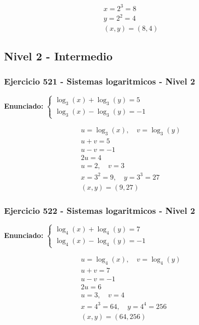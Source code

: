 \documentclass[12pt,a4paper]{article}
\begin{document}
\[
\begin{aligned}
x=2^{3}=8\\
y=2^{2}=4\\
\boxed{(x,y)=(8,4)}
\end{aligned}
\]


\newpage

\subsection*{Nivel 2 - Intermedio}

\subsubsection*{Ejercicio 521 - Sistemas logaritmicos - Nivel 2}
\textbf{Enunciado:} \(\begin{cases} \log_{3}\left(x\right)+\log_{3}\left(y\right)=5\\ \log_{3}\left(x\right)-\log_{3}\left(y\right)=-1\end{cases}\)

\[
\begin{aligned}
u=\log_{3}\left(x\right),\quad v=\log_{3}\left(y\right)\\
u+v=5\\
u-v=-1\\
2u=4\\
u=2,\quad v=3\\
x=3^{2}=9,\quad y=3^{3}=27\\
\boxed{(x,y)=(9,27)}
\end{aligned}
\]


\subsubsection*{Ejercicio 522 - Sistemas logaritmicos - Nivel 2}
\textbf{Enunciado:} \(\begin{cases} \log_{4}\left(x\right)+\log_{4}\left(y\right)=7\\ \log_{4}\left(x\right)-\log_{4}\left(y\right)=-1\end{cases}\)

\[
\begin{aligned}
u=\log_{4}\left(x\right),\quad v=\log_{4}\left(y\right)\\
u+v=7\\
u-v=-1\\
2u=6\\
u=3,\quad v=4\\
x=4^{3}=64,\quad y=4^{4}=256\\
\boxed{(x,y)=(64,256)}
\end{aligned}
\]
\end{document}
